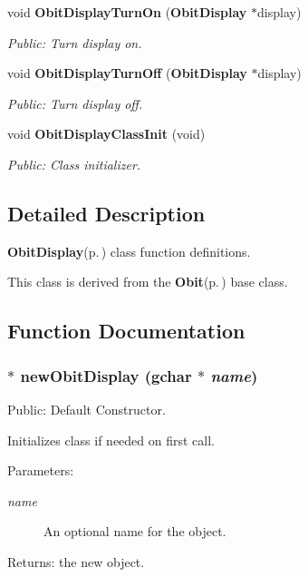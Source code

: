 \begin{CompactItemize}
void {\bf Obit\-Display\-Turn\-On} ({\bf Obit\-Display} $\ast$display)
\begin{CompactList}\small\item\em Public: Turn display on. \item\end{CompactList}\item 
void {\bf Obit\-Display\-Turn\-Off} ({\bf Obit\-Display} $\ast$display)
\begin{CompactList}\small\item\em Public: Turn display off. \item\end{CompactList}\item 
void {\bf Obit\-Display\-Class\-Init} (void)
\begin{CompactList}\small\item\em Public: Class initializer. \item\end{CompactList}\end{CompactItemize}


\subsection{Detailed Description}
{\bf Obit\-Display}{\rm (p.\,\pageref{structObitDisplay})} class function definitions. 

This class is derived from the {\bf Obit}{\rm (p.\,\pageref{structObit})} base class.

\subsection{Function Documentation}
\subsubsection{$\ast$ new\-Obit\-Display (gchar $\ast$ {\em name})}\label{ObitDisplay_8c_a12}


Public: Default Constructor. 

Initializes class if needed on first call. \begin{Desc}
\item[Parameters:]
\begin{description}
\item[{\em name}]An optional name for the object. \end{description}
\end{Desc}
\begin{Desc}
\item[Returns:]the new object. \end{Desc}
